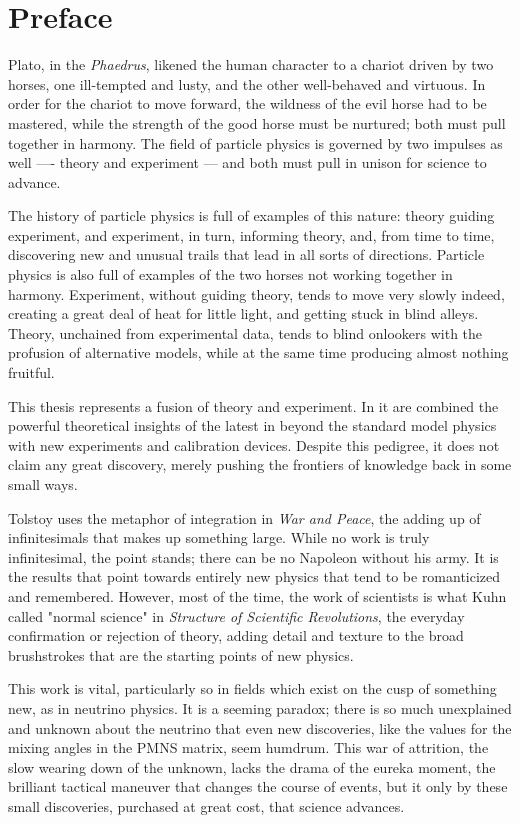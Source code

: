 \chapter*{Preface}

Plato, in the \emph{Phaedrus}, likened the human character to a chariot driven by two horses, one ill-tempted and lusty, and the other well-behaved and virtuous. In order for the chariot to move forward, the wildness of the evil horse had to be mastered, while the strength of the good horse must be nurtured; both must pull together in harmony. The field of particle physics is governed by two impulses as well ---- theory and experiment --- and both must pull in unison for science to advance. 

The history of particle physics is full of examples of this nature: theory guiding experiment, and experiment, in turn, informing theory, and, from time to time, discovering new and unusual trails that lead in all sorts of directions. Particle physics is also full of examples of the two horses not working together in harmony. Experiment, without guiding theory, tends to move very slowly indeed, creating a great deal of heat for little light, and getting stuck in blind alleys. Theory, unchained from experimental data, tends to blind onlookers with the profusion of alternative models, while at the same time producing almost nothing fruitful. 

This thesis represents a fusion of theory and experiment. In it are combined the powerful theoretical insights of the latest in beyond the standard model physics with new experiments and calibration devices. Despite this pedigree, it does not claim any great discovery, merely pushing the frontiers of knowledge back in some small ways.

Tolstoy uses the metaphor of integration in \emph{War and Peace}, the adding up of infinitesimals that makes up something large. While no work is truly infinitesimal, the point stands; there can be no Napoleon without his army. It is the results that point towards entirely new physics that tend to be romanticized and remembered. However, most of the time, the work of scientists is what Kuhn called "normal science" in \emph{Structure of Scientific Revolutions}, the everyday confirmation or rejection of theory, adding detail and texture to the broad brushstrokes that are the starting points of new physics. 

This work is vital, particularly so in fields which exist on the cusp of something new, as in neutrino physics. It is a seeming paradox; there is so much unexplained and unknown about the neutrino that even new discoveries, like the values for the mixing angles in the PMNS matrix, seem humdrum. This war of attrition, the slow wearing down of the unknown, lacks the drama of the eureka moment, the brilliant tactical maneuver that changes the course of events, but it only by these small discoveries, purchased at great cost, that science advances.
